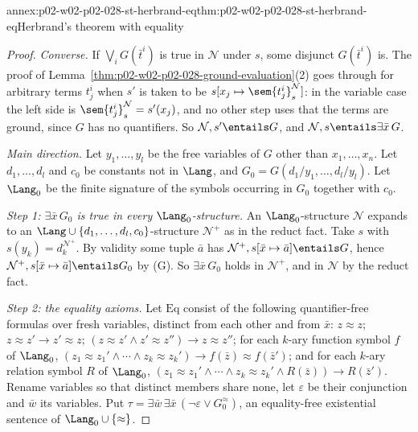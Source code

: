 \begin{annexitem}{annex:p02-w02-p02-028-st-herbrand-eq}{thm:p02-w02-p02-028-st-herbrand-eq}{Herbrand's theorem with equality}
\begin{proof}
\emph{Converse.}  If \(\bigvee_iG(\bar t^i)\) is true in \(\mathcal N\) under
\(s\), some disjunct \(G(\bar t^i)\) is.  The proof of
Lemma~\ref{thm:p02-w02-p02-028-ground-evaluation}(2) goes through for
arbitrary terms \(t^i_j\) when \(s'\) is taken to be
\(s[x_j\mapsto\sem{t^i_j}^{\mathcal N}_s]\): in the variable case the left
side is \(\sem{t^i_j}^{\mathcal N}_s=s'(x_j)\), and no other step uses that
the terms are ground, since \(G\) has no quantifiers.  So
\(\mathcal N,s'\entails G\), and \(\mathcal N,s\entails\exists\bar x\,G\).

\emph{Main direction.}  Let \(y_1,\ldots,y_l\) be the free variables of \(G\)
other than \(x_1,\ldots,x_n\).  Let \(d_1,\ldots,d_l\) and \(c_0\) be
constants not in \(\Lang\), and \(G_0=G(d_1/y_1,\ldots,d_l/y_l)\).  Let
\(\Lang_0\) be the finite signature of the symbols occurring in \(G_0\)
together with \(c_0\).

\emph{Step 1: \(\exists\bar x\,G_0\) is true in every
\(\Lang_0\)-structure.}  An \(\Lang_0\)-structure \(\mathcal N\) expands to
an \(\Lang\cup\{d_1,\ldots,d_l,c_0\}\)-structure \(\mathcal N^+\) as in the
reduct fact.  Take \(s\) with \(s(y_k)=d_k^{\mathcal N^+}\).  By validity some
tuple \(\bar a\) has \(\mathcal N^+,s[\bar x\mapsto\bar a]\entails G\), hence
\(\mathcal N^+,s[\bar x\mapsto\bar a]\entails G_0\) by (G).  So
\(\exists\bar x\,G_0\) holds in \(\mathcal N^+\), and in \(\mathcal N\) by
the reduct fact.

\emph{Step 2: the equality axioms.}  Let \(\mathrm{Eq}\) consist of the
following quantifier-free formulas over fresh variables, distinct from each
other and from \(\bar x\): \(z\approx z\); \(z\approx z'\to z'\approx z\);
\((z\approx z'\land z'\approx z'')\to z\approx z''\); for each \(k\)-ary
function symbol \(f\) of \(\Lang_0\),
\((z_1\approx z_1'\land\cdots\land z_k\approx z_k')\to f(\bar z)\approx f(\bar z')\);
and for each \(k\)-ary relation symbol \(R\) of \(\Lang_0\),
\((z_1\approx z_1'\land\cdots\land z_k\approx z_k'\land R(\bar z))\to R(\bar z')\).
Rename variables so that distinct members share none, let \(\varepsilon\) be
their conjunction and \(\bar w\) its variables.  Put
\(\tau=\exists\bar w\,\exists\bar x\,(\neg\varepsilon\lor G_0^{\approx})\), an
equality-free existential sentence of \(\Lang_0\cup\{\approx\}\).


\end{proof}
\end{annexitem}
